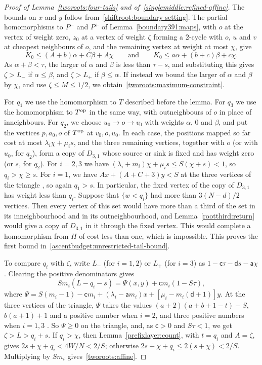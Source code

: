 \begin{proof}[Proof of Lemma~\ref{tworoots:four-tails} and of~\eqref{singlemiddle:refined-affine}]
The bounds on $x$ and $y$ follow from~\eqref{shiftroot:boundary-setting}.
The partial homomorphisms to $P^-$ and $P^+$ of Lemma~\ref{boundary391:maps}, with $o$ at the vertex of weight zero, $z_0$ at a vertex of weight $\zeta$ forming a $2$-cycle with $o$, $u$ and $v$ at cheapest neighbours of $o$, and the remaining vertex at weight at most $\chi$, give
\[
 K_0\le(A+b)\alpha+C\beta+A\chi
 \qquad\text{and}\qquad K_0\le a\alpha+(b+c)\beta+c\chi.
\]
As $\alpha+\beta<\tau$, the larger of $\alpha$ and $\beta$ is less than $\tau-s$, and substituting this gives
$\zeta>L_-$ if $\alpha\le\beta$, and $\zeta>L_+$ if $\beta\le\alpha$. If instead we bound the larger of $\alpha$ and $\beta$ by $\chi$, and use $\zeta\le M\le1/2$, we obtain~\eqref{tworoots:maximum-constraint}.

For $q_1$ we use the homomorphism to $T$ described before the lemma. For $q_3$ we use the homomorphism to $T^{\rm op}$ in the same way, with outneighbours of $o$ in place of inneighbours.
For $q_2$, we choose $u_0\to o\to v_0$ with weights
$\alpha$, $0$ and $\beta$, and put the vertices $p,a_0,o$ of $T^{\rm op}$
at $v_0,o,u_0$. In each case, the positions mapped so far cost at most $\lambda_i\chi+\mu_is$, and the three remaining vertices, together with $o$ (or with $u_0$, for $q_2$), form a copy of $D_{3,1}$ whose source or sink is fixed and has weight zero (or $s$, for $q_2$).
For $i=2,3$ we have $(\lambda_i+m_i)\chi+\mu_is\le S(\chi+s)<1$,
so $q_i>\chi\ge s$. For $i=1$, we have $Ax+(A+C+3)y<S$ at the three
vertices of the triangle , so again $q_1>s$.
In particular, the fixed vertex of the copy of $D_{3,1}$ has weight less than $q_i$. Suppose that $\{w<q_i\}$ had more than
$3(N-d)/2$ vertices. Then every vertex of this set would have more than a third of the set in its inneighbourhood and in its outneighbourhood, and Lemma~\ref{rootthird:return} would give a copy of $D_{3,1}$ in it through the fixed vertex. This would complete a homomorphism from $H$
of cost less than one, which is impossible. This proves the first bound in~\eqref{ascentbudget:unrestricted-tail-bound}.

To compare $q_i$ with $\zeta$, write $L_-$ (for $i=1,2$) or $L_+$ (for $i=3$) as $1-\mathsf c\tau-
\mathsf d s-\mathsf a\chi$. Clearing the positive denominators gives
\begin{equation}\label{tworoots:comparison-identity}
 Sm_i(L-q_i-s)=\Psi(x,y)+\mathsf cm_i(1-S\tau),
\end{equation}
where $\Psi=S(m_i-1)-\mathsf cm_i+(\lambda_i-\mathsf am_i)x +[\mu_i-m_i(\mathsf d+1)]y$.
At the three vertices of the triangle, $\Psi$ takes the values
$(a+2)(a+b+1-t)-S$, $b(a+1)+1$ and a positive number when $i=2$, and three positive numbers when $i=1,3$ .
So $\Psi\ge0$ on the triangle, and, as $\mathsf c>0$ and $S\tau<1$, we get
$\zeta>L>q_i+s$.
If $q_i>\chi$, then Lemma~\ref{prefixlayer:count}, with $t=q_i$ and $A=\zeta$, gives $2s+\chi+q_i<4W/N<2/S$; otherwise $2s+\chi+q_i\le2(s+\chi)<2/S$.
Multiplying by $Sm_i$ gives~\eqref{tworoots:affine}.


\end{proof}
